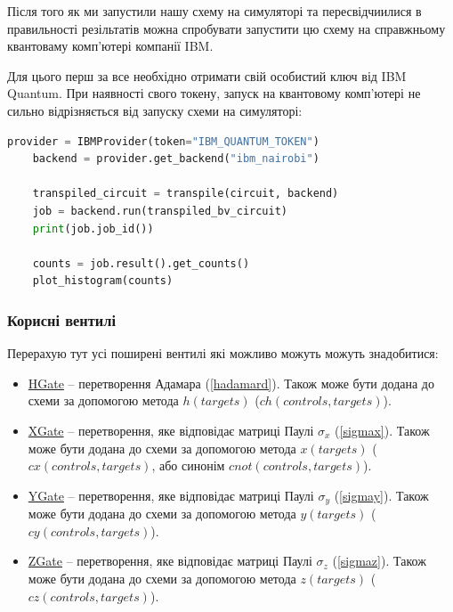 \documentclass{article}
\begin{document}
Після того як ми запустили нашу схему на симуляторі та пересвідчиилися в правильності резільтатів можна спробувати запустити цю схему на справжньому квантоваму комп'ютері компанії IBM.

Для цього перш за все необхідно отримати свій особистий ключ від IBM Quantum. 
При наявності свого токену, запуск на квантовому комп'ютері не сильно відрізняється від запуску схеми на симуляторі: 
\begin{lstlisting}[language=Python]
    provider = IBMProvider(token="IBM_QUANTUM_TOKEN")
    backend = provider.get_backend("ibm_nairobi")
    
    transpiled_circuit = transpile(circuit, backend)
    job = backend.run(transpiled_bv_circuit)
    print(job.job_id())

    counts = job.result().get_counts()
    plot_histogram(counts)
\end{lstlisting}

\subsubsection{Корисні вентилі}

Перерахую тут усі поширені вентилі які можливо можуть можуть знадобитися:
\begin{itemize}
    \item \href{https://qiskit.org/documentation/stubs/qiskit.circuit.library.HGate.html#hgate}{HGate} -- перетворення Адамара (\ref{hadamard}). Також може бути додана до схеми за допомогою метода $h(targets)$ ($ch(controls, targets)$).
    \item \href{https://qiskit.org/documentation/stubs/qiskit.circuit.library.XGate.html#xgate}{XGate} -- перетворення, яке відповідає матриці Паулі $\sigma_x$ (\ref{sigmax}). Також може бути додана до схеми за допомогою метода $x(targets)$ ($cx(controls, targets)$, або синонім $cnot(controls, targets)$).
    \item \href{https://qiskit.org/documentation/stubs/qiskit.circuit.library.YGate.html#ygate}{YGate} -- перетворення, яке відповідає матриці Паулі $\sigma_y$ (\ref{sigmay}). Також може бути додана до схеми за допомогою метода $y(targets)$ ($cy(controls, targets)$).
    \item \href{https://qiskit.org/documentation/stubs/qiskit.circuit.library.ZGate.html#zgate}{ZGate} -- перетворення, яке відповідає матриці Паулі $\sigma_z$ (\ref{sigmaz}). Також може бути додана до схеми за допомогою метода $z(targets)$ ($cz(controls, targets)$).
\end{itemize}
\end{document}
